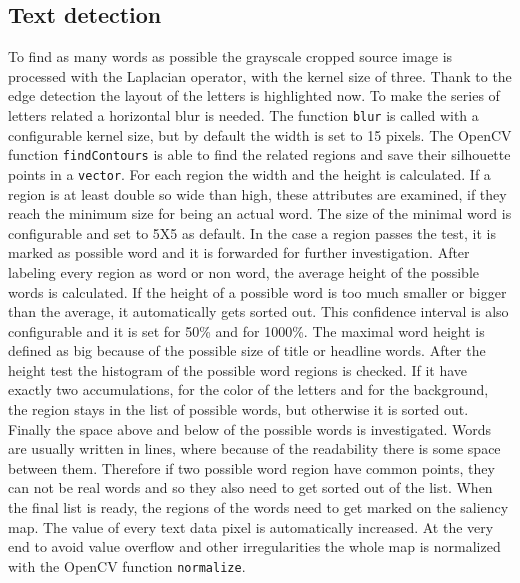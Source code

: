\documentclass[draft,final]{vutinfth} %
\begin{document}
\subsection{Text detection}
To find as many words as possible the grayscale cropped source image is processed with the Laplacian operator, with the kernel size of three.
Thank to the edge detection the layout of the letters is highlighted now.
To make the series of letters related a horizontal blur is needed.
The function \texttt{blur} is called with a configurable kernel size, but by default the width is set to 15 pixels.
The OpenCV function  \texttt{findContours} is able to find the related regions and save their silhouette points in a \texttt{vector}.
For each region the width and the height is calculated.
If a region is at least double so wide than high, these attributes are examined, if they reach the minimum size for being an actual word.
The size of the minimal word is configurable and set to 5X5 as default.
In the case a region passes the test, it is marked as possible word and it is forwarded for further investigation.
After labeling every region as word or non word, the average height of the possible words is calculated.
If the height of a possible word is too much smaller or bigger than the average, it automatically gets sorted out.
This confidence interval is also configurable and it is set for 50\% and for 1000\%. 
The maximal word height is defined as big because of the possible size of title or headline words.
After the height test the histogram of the possible word regions is checked.
If it have exactly two accumulations, for the color of the letters and for the background, the region stays in the list of possible words, but otherwise it is sorted out.
Finally the space above and below of the possible words is investigated.
Words are usually written in lines, where because of the readability there is some space between them.
Therefore if two possible word region have common points, they can not be real words and so they also need to get sorted out of the list.
When the final list is ready, the regions of the words need to get marked on the saliency map.
The value of every text data pixel is automatically increased.
At the very end to avoid value overflow and other irregularities the whole map is normalized with the OpenCV function \texttt{normalize}.  
\end{document}
